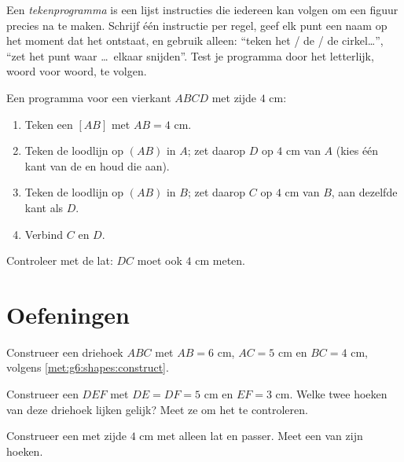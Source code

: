 \begin{method}[Tekenprogramma's]\label{met:g6:shapes:program}
Een \emph{tekenprogramma} is een lijst instructies die iedereen kan volgen om
een figuur precies na te maken. Schrijf één instructie per regel, geef elk punt
een naam op het moment dat het ontstaat, en gebruik alleen: ``teken het
 / de  / de cirkel\dots'', ``zet het punt waar \dots\ elkaar
snijden''. Test je programma door het letterlijk, woord voor woord, te volgen.
\end{method}

\begin{example}\label{ex:g6:shapes:program}
Een programma voor een vierkant $ABCD$ met zijde $4$ cm:
\begin{enumerate}
  \item Teken een  $[AB]$ met $AB = 4$ cm.
  \item Teken de loodlijn op $(AB)$ in $A$; zet daarop $D$ op $4$ cm van $A$
        (kies één kant van de  en houd die aan).
  \item Teken de loodlijn op $(AB)$ in $B$; zet daarop $C$ op $4$ cm van $B$,
        aan dezelfde kant als $D$.
  \item Verbind $C$ en $D$.
\end{enumerate}
Controleer met de lat: $DC$ moet ook $4$ cm meten.
\end{example}

\section{Oefeningen}

\begin{exercise}[$\star$]\label{exo:g6:shapes:1}
Construeer een driehoek $ABC$ met $AB = 6$ cm, $AC = 5$ cm en $BC = 4$ cm,
volgens \cref{met:g6:shapes:construct}.
\end{exercise}

\begin{exercise}[$\star$]\label{exo:g6:shapes:2}
Construeer een  $DEF$ met $DE = DF = 5$ cm en
$EF = 3$ cm. Welke twee hoeken van deze driehoek lijken gelijk? Meet ze om het
te controleren.
\end{exercise}

\begin{exercise}[$\star$]\label{exo:g6:shapes:3}
Construeer een  met zijde $4$ cm met alleen lat en
passer. Meet een van zijn hoeken.
\end{exercise}

